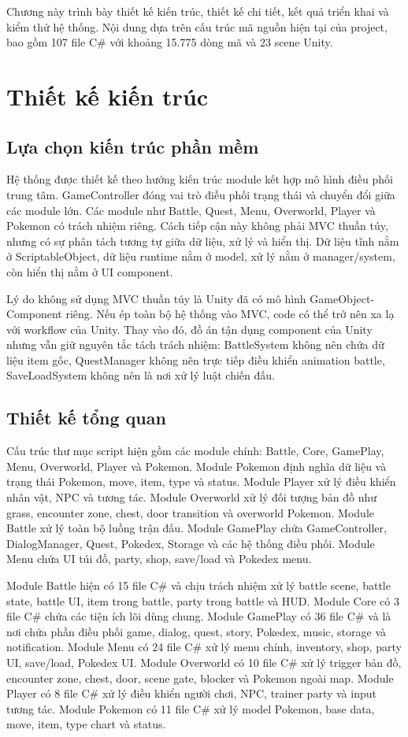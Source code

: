 Chương này trình bày thiết kế kiến trúc, thiết kế chi tiết, kết quả triển khai và kiểm thử hệ thống. Nội dung dựa trên cấu trúc mã nguồn hiện tại của project, bao gồm 107 file C\# với khoảng 15.775 dòng mã và 23 scene Unity.

\section{Thiết kế kiến trúc}

\subsection{Lựa chọn kiến trúc phần mềm}

Hệ thống được thiết kế theo hướng kiến trúc module kết hợp mô hình điều phối trung tâm. GameController đóng vai trò điều phối trạng thái và chuyển đổi giữa các module lớn. Các module như Battle, Quest, Menu, Overworld, Player và Pokemon có trách nhiệm riêng. Cách tiếp cận này không phải MVC thuần túy, nhưng có sự phân tách tương tự giữa dữ liệu, xử lý và hiển thị. Dữ liệu tĩnh nằm ở ScriptableObject, dữ liệu runtime nằm ở model, xử lý nằm ở manager/system, còn hiển thị nằm ở UI component.

Lý do không sử dụng MVC thuần túy là Unity đã có mô hình GameObject-Component riêng. Nếu ép toàn bộ hệ thống vào MVC, code có thể trở nên xa lạ với workflow của Unity. Thay vào đó, đồ án tận dụng component của Unity nhưng vẫn giữ nguyên tắc tách trách nhiệm: BattleSystem không nên chứa dữ liệu item gốc, QuestManager không nên trực tiếp điều khiển animation battle, SaveLoadSystem không nên là nơi xử lý luật chiến đấu.

\subsection{Thiết kế tổng quan}

Cấu trúc thư mục script hiện gồm các module chính: Battle, Core, GamePlay, Menu, Overworld, Player và Pokemon. Module Pokemon định nghĩa dữ liệu và trạng thái Pokemon, move, item, type và status. Module Player xử lý điều khiển nhân vật, NPC và tương tác. Module Overworld xử lý đối tượng bản đồ như grass, encounter zone, chest, door transition và overworld Pokemon. Module Battle xử lý toàn bộ luồng trận đấu. Module GamePlay chứa GameController, DialogManager, Quest, Pokedex, Storage và các hệ thống điều phối. Module Menu chứa UI túi đồ, party, shop, save/load và Pokedex menu.

Module Battle hiện có 15 file C\# và chịu trách nhiệm xử lý battle scene, battle state, battle UI, item trong battle, party trong battle và HUD. Module Core có 3 file C\# chứa các tiện ích lõi dùng chung. Module GamePlay có 36 file C\# và là nơi chứa phần điều phối game, dialog, quest, story, Pokedex, music, storage và notification. Module Menu có 24 file C\# xử lý menu chính, inventory, shop, party UI, save/load, Pokedex UI. Module Overworld có 10 file C\# xử lý trigger bản đồ, encounter zone, chest, door, scene gate, blocker và Pokemon ngoài map. Module Player có 8 file C\# xử lý điều khiển người chơi, NPC, trainer party và input tương tác. Module Pokemon có 11 file C\# xử lý model Pokemon, base data, move, item, type chart và status.


